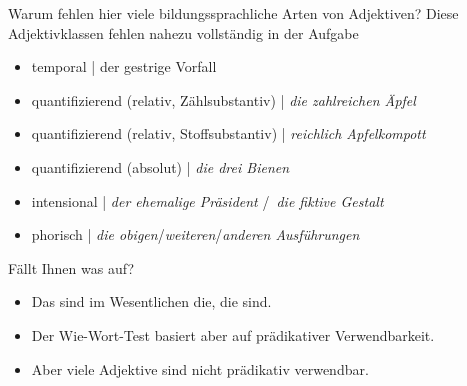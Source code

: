 \begin{frame}
  {Warum fehlen hier viele bildungssprachliche Arten von Adjektiven?}
  \pause
  \small
  Diese Adjektivklassen fehlen nahezu vollständig in der Aufgabe
  \pause
  \begin{itemize}[<+->]
    \item \alert{temporal} | der \alert{gestrige} Vorfall
    \item \alert{quantifizierend} (relativ, Zählsubstantiv) | \textit{die \alert{zahlreichen} Äpfel}
    \item \alert{quantifizierend} (relativ, Stoffsubstantiv) | \textit{\alert{reichlich} Apfelkompott}
    \item \alert{quantifizierend} (absolut) | \textit{die \alert{drei} Bienen}
    \item \alert{intensional} | \textit{der \alert{ehemalige} Präsident} \slash\ \textit{die \alert{fiktive} Gestalt}
    \item \alert{phorisch} | \textit{die \alert{obigen}}/\textit{\alert{weiteren}}/\textit{\alert{anderen} Ausführungen}
  \end{itemize}
  \pause
  \Halbzeile
  Fällt Ihnen was auf?
  \pause
  \begin{itemize}[<+->]
    \item Das sind im Wesentlichen die, die  sind.
    \item Der Wie-Wort-Test basiert aber auf prädikativer Verwendbarkeit.
    \item Aber viele Adjektive sind nicht prädikativ verwendbar. 
  \end{itemize}
\end{frame}



